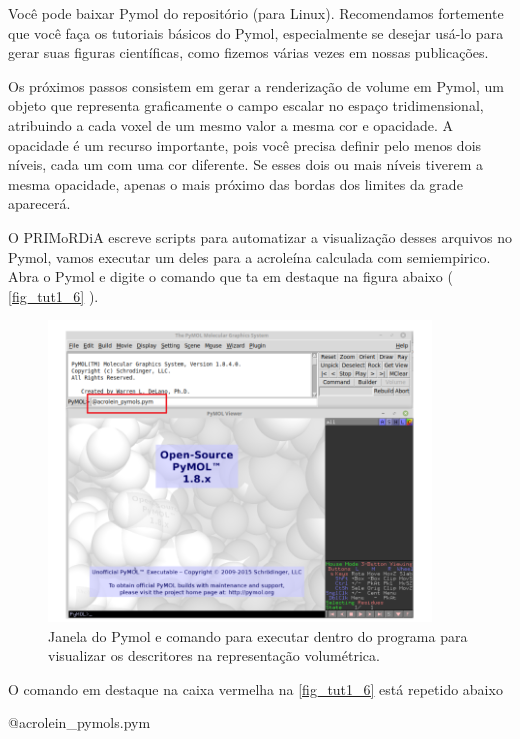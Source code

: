 \documentclass[a4paper,11pt]{refart}
\begin{document}
Você pode baixar Pymol do repositório (para Linux). Recomendamos fortemente que você faça os tutoriais básicos do Pymol, especialmente se desejar usá-lo para gerar suas figuras científicas, como fizemos várias vezes em nossas publicações. 

Os próximos passos consistem em gerar a renderização de volume em Pymol, um objeto que representa graficamente o campo escalar no espaço tridimensional, atribuindo a cada voxel de um mesmo valor a mesma cor e opacidade. A opacidade é um recurso importante, pois você precisa definir pelo menos dois níveis, cada um com uma cor diferente. Se esses dois ou mais níveis tiverem a mesma opacidade, apenas o mais próximo das bordas dos limites da grade aparecerá.

O PRIMoRDiA escreve scripts para automatizar a visualização desses arquivos no Pymol, vamos executar um deles para a acroleína calculada com semiempirico. Abra o Pymol e digite o comando que ta em destaque na figura abaixo ( \autoref{fig_tut1_6} ). 

\hspace*{-\leftmarginwidth}
\begin{minipage}{\fullwidth}
\begin{figure}[H]
\begin{center}
\includegraphics[width=4in]{images/img7}
\caption{Janela do Pymol e comando para executar dentro do programa para visualizar os descritores na representação volumétrica.}
\label{fig_tut1_6}
\end{center}
\end{figure}
\end{minipage}

O comando em destaque na caixa vermelha na \autoref{fig_tut1_6} está repetido abaixo

\hspace*{-\leftmarginwidth}
\begin{minipage}{\fullwidth}
	\begin{pymol}@acrolein_pymols.pym\end{pymol}
\end{minipage}
\end{document}
